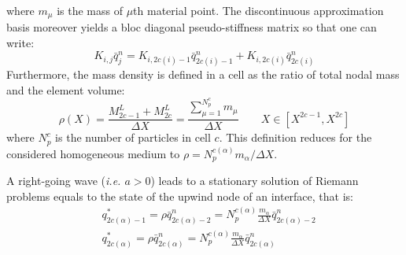 where $m_\mu$ is the mass of $\mu$th material point. The discontinuous approximation basis moreover yields a bloc diagonal pseudo-stiffness matrix so that one can write:
\begin{equation}
  \label{eq:block_diag_K}
  K_{i,j} \bar{q}_{j}^{n}= K_{i,2c(i)-1} \bar{q}_{2c(i)-1}^{n}+K_{i,2c(i)} \bar{q}_{2c(i)}^{n}
\end{equation}
Furthermore, the mass density is defined in a cell as the ratio of total nodal mass and the element volume:
\begin{equation}
  \label{eq:grid_density}
  \rho(X) = \frac{M^L_{2c-1}+M^L_{2c}}{\Delta X} = \frac{\sum_{\mu=1}^{N_p^c} m_\mu}{\Delta X} \qquad X \in [X^{2c-1},X^{2c}]
\end{equation}
where $N_p^{c}$ is the number of particles in cell $c$. This definition reduces for the considered homogeneous medium to $\rho = N_p^{c(\alpha)} m_\alpha/\Delta X$.

A right-going wave (\textit{i.e. $a>0$}) leads to a stationary solution of Riemann problems equals to the state of the upwind node of an interface, that is:
\begin{align}
  & q_{2c(\alpha)-1}^* = \rho \bar{q}^n_{2c(\alpha)-2}=  N_p^{c( \alpha)}\frac{ m_\alpha}{\Delta X}\bar{q}^n_{2c(\alpha)-2} \\
  & q_{2c(\alpha)}^* = \rho \bar{q}^n_{2c(\alpha)} =  N_p^{c( \alpha)}\frac{ m_\alpha}{\Delta X} \bar{q}^n_{2c(\alpha)} 
\end{align}

